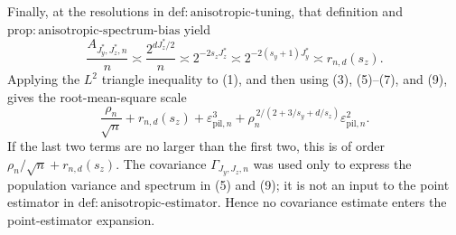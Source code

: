 Finally, at the resolutions in \(\mathrm{def{:}anisotropic\text{-}tuning}\), that definition and \(\mathrm{prop{:}anisotropic\text{-}spectrum\text{-}bias}\) yield
\[
\frac{A_{J_y^*,J_z^*,n}}n
\asymp\frac{2^{dJ_z^*/2}}n
\asymp2^{-2s_zJ_z^*}
\asymp2^{-2(s_y+1)J_y^*}
\asymp r_{n,d}(s_z).                                                      \tag{9}
\]
Applying the \(L^2\) triangle inequality to (1), and then using (3), (5)--(7), and (9), gives the root-mean-square scale
\[
\frac{\rho_n}{\sqrt n}+r_{n,d}(s_z)
+\varepsilon_{\mathrm{pil},n}^3
+\rho_n^{\,2/(2+3/s_y+d/s_z)}\varepsilon_{\mathrm{pil},n}^2.
\]
If the last two terms are no larger than the first two, this is of order \(\rho_n/\sqrt n+r_{n,d}(s_z)\).  The covariance \(\Gamma_{J_y,J_z,n}\) was used only to express the population variance and spectrum in (5) and (9); it is not an input to the point estimator in \(\mathrm{def{:}anisotropic\text{-}estimator}\).  Hence no covariance estimate enters the point-estimator expansion.